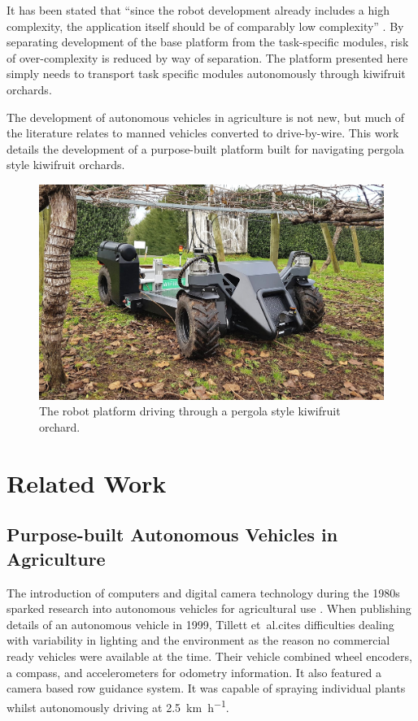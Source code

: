 \documentclass[preprint,authoryear,12pt]{elsarticle}
\begin{document}
    It has been stated that ``since the robot development already includes a high complexity, the application itself should be of comparably low complexity'' \citep{Ruckelshausen2009}.
    By separating development of the base platform from the task-specific modules, risk of over-complexity is reduced by way of separation.
    The platform presented here simply needs to transport task specific modules autonomously through kiwifruit orchards.

    The development of autonomous vehicles in agriculture is not new, but much of the literature relates to manned vehicles converted to drive-by-wire.
    This work details the development of a purpose-built platform built for navigating pergola style kiwifruit orchards.

    \begin{figure}[htb]
        \centering
        \includegraphics[width=\linewidth]{imgs/photos/suzy_general.jpg}
        \caption{
            The robot platform driving through a pergola style kiwifruit orchard.
        }
        \label{fig:suzy}
    \end{figure}

\section{Related Work}
\label{sect:review}

    \subsection{Purpose-built Autonomous Vehicles in Agriculture}

        The introduction of computers and digital camera technology during the 1980s sparked research into autonomous vehicles for agricultural use \citep{Li2009}.
        When publishing details of an autonomous vehicle in 1999, Tillett et~al.\@ cites difficulties dealing with variability in lighting and the environment as the reason no commercial ready vehicles were available at the time.
        Their vehicle combined wheel encoders, a compass, and accelerometers for odometry information.
        It also featured a camera based row guidance system.
        It was capable of spraying individual plants whilst autonomously driving at \SI{2.5}{\kilo\meter\per\hour}.
\end{document}
